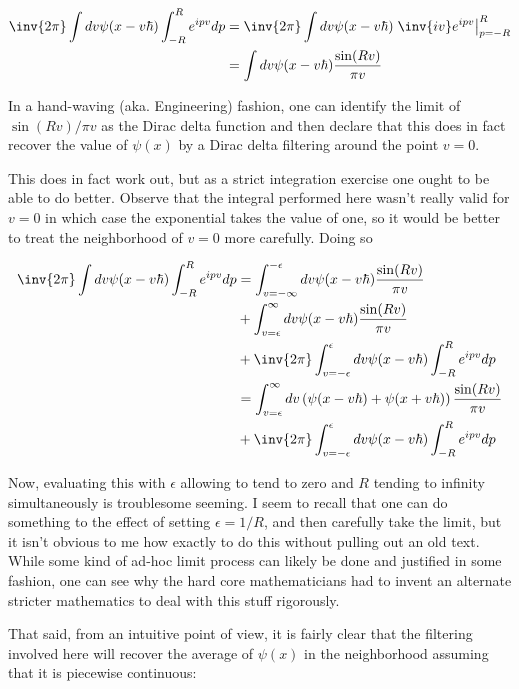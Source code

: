 \documentclass{article}
\begin{document}
\begin{align*}
\inv{{2\pi}} \int dv \psi(x -v\hbar) \int_{-R}^R e^{i p v} dp 
&= \inv{{2\pi}} \int dv \psi(x - v\hbar) \left. \inv{i v} e^{i p v} \right\vert_{p=-R}^R \\
&= \int dv \psi(x - v\hbar) \frac{\sin(R v)}{\pi v} \\
\end{align*}

In a hand-waving (aka. Engineering) fashion, one can identify the limit of $\sin(Rv)/\pi v$ as the Dirac delta function and
then declare that this does in fact recover the value of $\psi(x)$ by a Dirac delta filtering around the point $v=0$.

This does in fact work out, but as a strict integration exercise one ought to be able to do better.
Observe that the integral performed here wasn't really valid for $v=0$ in which case the exponential takes the value of one, so it would be
better to treat the neighborhood of $v=0$ more carefully.  Doing so

\begin{align*}
\inv{{2\pi}} \int dv \psi(x -v\hbar) \int_{-R}^R e^{i p v} dp 
&= \int_{v=-\infty}^{-\epsilon} dv \psi(x - v\hbar) \frac{\sin(R v)}{\pi v} \\
&+ \int_{v=\epsilon}^\infty dv \psi(x - v\hbar) \frac{\sin(R v)}{\pi v} \\
&+ \inv{{2\pi}} \int_{v=-\epsilon}^\epsilon dv \psi(x - v\hbar) \int_{-R}^R e^{i p v} dp \\
&= \int_{v=\epsilon}^\infty dv \left( \psi(x - v\hbar) +\psi(x + v\hbar) \right) \frac{\sin(R v)}{\pi v} \\
&+ \inv{{2\pi}} \int_{v=-\epsilon}^\epsilon dv \psi(x - v\hbar) \int_{-R}^R e^{i p v} dp \\
\end{align*}

Now, evaluating this with $\epsilon$ allowing to tend to zero and $R$ tending to infinity simultaneously is troublesome seeming.  I seem to recall that one
can do something to the effect of setting $\epsilon=1/R$, and then carefully take the limit, but it isn't obvious to me how exactly to do this without
pulling out an old text.
While some kind of ad-hoc limit process can likely be done and justified in some fashion, one can see why the hard core mathematicians had to invent
an alternate stricter mathematics to deal with this stuff rigorously.

That said, from an intuitive point of view, it is fairly clear that the filtering involved here will recover the average of
$\psi(x)$ in the neighborhood assuming that it is piecewise continuous:
\end{document}
